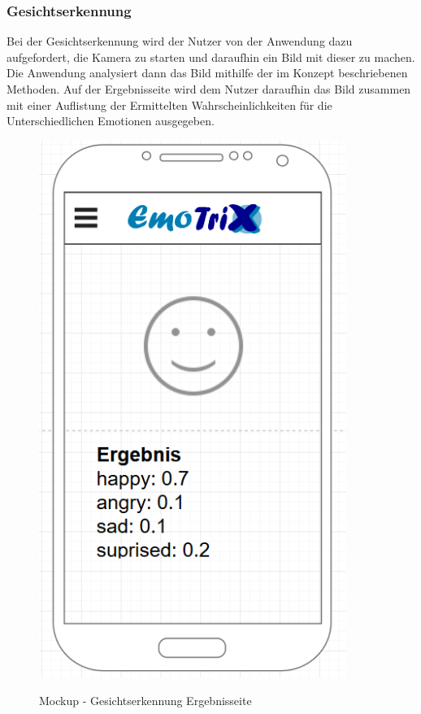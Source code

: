 \subsubsection{Gesichtserkennung}
Bei der Gesichtserkennung wird der Nutzer von der Anwendung dazu aufgefordert, die Kamera zu starten und daraufhin ein Bild mit dieser zu machen. Die Anwendung analysiert dann das Bild mithilfe der im Konzept beschriebenen Methoden. Auf der Ergebnisseite wird dem Nutzer daraufhin das Bild zusammen mit einer Auflistung der Ermittelten Wahrscheinlichkeiten für die Unterschiedlichen Emotionen ausgegeben.
\begin{figure}[h]
	\centering
	\includegraphics[width=10cm]{Bilder/Mockup-Gesichtserkennung.png}
	\label{img:Mockup-Gesichtserkennung}
	\caption[Mockup - Gesichtserkennung Ergebnisseite]{Mockup - Gesichtserkennung Ergebnisseite}
\end{figure}%
